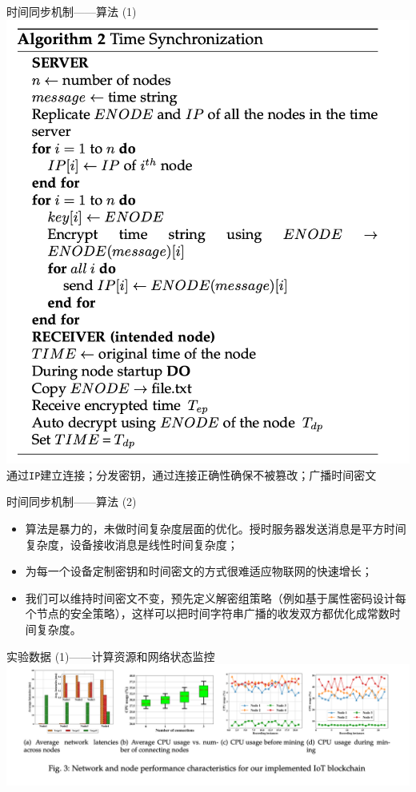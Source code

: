 \documentclass{beamer}
\begin{document}
\begin{frame}{时间同步机制——算法 (1)}
	\includegraphics[width=0.618\linewidth]{Assets/算法2}\\
	通过\texttt{IP}建立连接；分发密钥，通过连接正确性确保不被篡改；广播时间密文
\end{frame}

\begin{frame}{时间同步机制——算法 (2)}
	\begin{itemize}
		\item 算法是暴力的，未做时间复杂度层面的优化。授时服务器发送消息是平方时间复杂度，设备接收消息是线性时间复杂度；
		\item 为每一个设备定制密钥和时间密文的方式很难适应物联网的快速增长；
		\item 我们可以维持时间密文不变，预先定义解密组策略（例如基于属性密码设计每个节点的安全策略），这样可以把时间字符串广播的收发双方都优化成常数时间复杂度。
	\end{itemize}
\end{frame}

\begin{frame}{实验数据 (1)——计算资源和网络状态监控}
	\includegraphics[width=\linewidth]{Assets/图3}
\end{frame}
\end{document}
